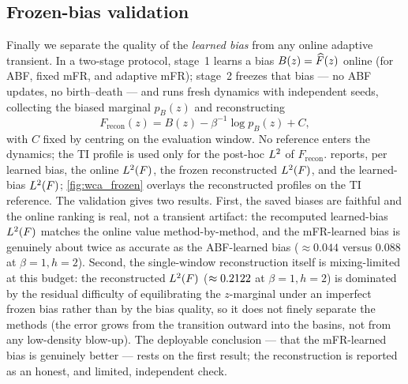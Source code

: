 \subsection{Frozen-bias validation}
\label{sec:wca_frozen}
Finally we separate the quality of the \emph{learned bias} from any online
adaptive transient. In a two-stage protocol, stage~1 learns a bias
$B(z)=\widehat{F}(z)$ online (for ABF, fixed mFR, and adaptive mFR); stage~2 freezes
that bias --- no ABF updates, no birth--death --- and runs fresh dynamics with
independent seeds, collecting the biased marginal $p_B(z)$ and reconstructing
\begin{equation}
  F_{\mathrm{recon}}(z) = B(z) - \beta^{-1}\log p_B(z) + C,
  \label{eq:frozen_recon}
\end{equation}
with $C$ fixed by centring on the evaluation window. No reference enters the
dynamics; the TI profile is used only for the post-hoc $L^2$ of
$F_{\mathrm{recon}}$.  reports, per learned bias, the
online $\Ltwo(F)$, the frozen reconstructed $\Ltwo(F)$, and the learned-bias
$\Ltwo(F)$; \cref{fig:wca_frozen} overlays the reconstructed profiles on the TI
reference. The validation gives two results. First, the saved biases are faithful
and the online ranking is real, not a transient artifact: the recomputed
learned-bias $\Ltwo(F)$ matches the online value method-by-method, and the
mFR-learned bias is genuinely about twice as accurate as the ABF-learned bias
($\approx0.044$ versus $0.088$ at $\beta=1,h=2$). Second, the single-window
reconstruction itself is mixing-limited at this budget: the reconstructed
$\Ltwo(F)$ ($\approx0.2122$ at $\beta=1,h=2$) is dominated by
the residual difficulty of equilibrating the $z$-marginal under an imperfect frozen
bias rather than by the bias quality, so it does not finely separate the methods
(the error grows from the transition outward into the basins, not from any
low-density blow-up). The deployable conclusion --- that the mFR-learned bias is
genuinely better --- rests on the first result; the reconstruction is reported as
an honest, and limited, independent check.

\begin{table}[t]
  \centering
  \small
  \caption{Frozen-bias reconstruction~\eqref{eq:frozen_recon}. For each learned bias
    (ABF, mFR, adaptive mFR) on a starved ($\beta{=}1,h{=}2$) and an easy
    ($\beta{=}4,h{=}1$) cell: the online $\Ltwo(F)$, the frozen reconstructed
    $\Ltwo(F)$ from fresh unbiased dynamics, and the recomputed learned-bias
    $\Ltwo(F)$ (median over seeds). The recomputed learned-bias error matches the
    online value method-by-method, confirming the online ranking; the single-window
    reconstruction is mixing-limited and does not finely separate the methods.}
  \label{tab:wca_frozen_bias}
  
\end{table}

